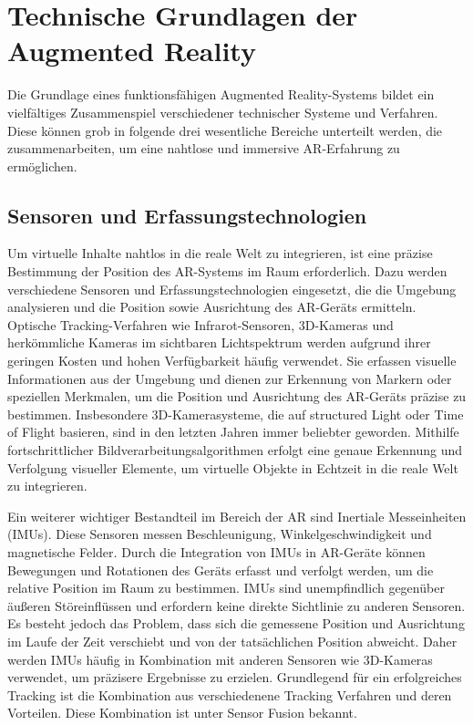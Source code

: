 \section{Technische Grundlagen der Augmented Reality}

Die Grundlage eines funktionsfähigen Augmented Reality-Systems bildet ein
vielfältiges Zusammenspiel verschiedener technischer Systeme und Verfahren.
Diese können grob in folgende drei wesentliche Bereiche unterteilt werden, die
zusammenarbeiten, um eine nahtlose und immersive AR-Erfahrung zu ermöglichen.

\subsection{Sensoren und Erfassungstechnologien}

Um virtuelle Inhalte nahtlos in die reale Welt zu integrieren, ist eine präzise
Bestimmung der Position des AR-Systems im Raum erforderlich. Dazu werden
verschiedene Sensoren und Erfassungstechnologien eingesetzt, die die Umgebung
analysieren und die Position sowie Ausrichtung des AR-Geräts ermitteln.
Optische Tracking-Verfahren wie Infrarot-Sensoren, 3D-Kameras und herkömmliche
Kameras im sichtbaren Lichtspektrum werden aufgrund ihrer geringen Kosten und
hohen Verfügbarkeit häufig verwendet. Sie erfassen visuelle Informationen aus
der Umgebung und dienen zur Erkennung von Markern oder speziellen Merkmalen, um
die Position und Ausrichtung des AR-Geräts präzise zu bestimmen. Insbesondere
3D-Kamerasysteme, die auf structured Light oder Time of Flight basieren, sind
in den letzten Jahren immer beliebter geworden. Mithilfe fortschrittlicher
Bildverarbeitungsalgorithmen erfolgt eine genaue Erkennung und Verfolgung
visueller Elemente, um virtuelle Objekte in Echtzeit in die reale Welt zu
integrieren.

Ein weiterer wichtiger Bestandteil im Bereich der AR sind Inertiale
Messeinheiten (IMUs). Diese Sensoren messen Beschleunigung,
Winkelgeschwindigkeit und magnetische Felder. Durch die Integration von IMUs in
AR-Geräte können Bewegungen und Rotationen des Geräts erfasst und verfolgt
werden, um die relative Position im Raum zu bestimmen. IMUs sind unempfindlich
gegenüber äußeren Störeinflüssen und erfordern keine direkte Sichtlinie zu
anderen Sensoren. Es besteht jedoch das Problem, dass sich die gemessene
Position und Ausrichtung im Laufe der Zeit verschiebt und von der tatsächlichen
Position abweicht. Daher werden IMUs häufig in Kombination mit anderen Sensoren
wie 3D-Kameras verwendet, um präzisere Ergebnisse zu erzielen. Grundlegend für
ein erfolgreiches Tracking ist die Kombination aus verschiedenene Tracking
Verfahren und deren Vorteilen. Diese Kombination ist unter Sensor Fusion
bekannt.

